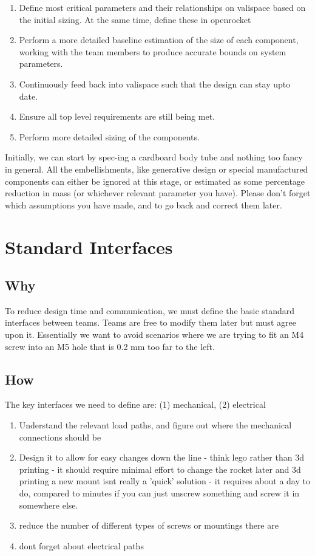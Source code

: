 \documentclass[12pt]{article}
\begin{document}
\begin{enumerate}
\item Define most critical parameters and their relationships on valispace based on the initial sizing. At the same time, define these in openrocket 
\item  Perform a more detailed baseline estimation of the size of each component, working with the team members to produce accurate bounds on system parameters. 
\item  Continuously feed back into valispace such that the design can stay upto date. 
\item Ensure all top level requirements are still being met. 
\item Perform more detailed sizing of the components. 
\end{enumerate}


Initially, we can start by spec-ing a cardboard body tube and nothing too fancy in general. All the embellishments, like generative design or special manufactured components can either be ignored at this stage, or estimated as some percentage reduction in mass (or whichever relevant parameter you have). Please don't forget which assumptions you have made, and to go back and correct them later. 

\section{Standard Interfaces}

\subsection{Why}
To reduce design time and communication, we must define the basic standard interfaces between teams. Teams are free to modify them later but must agree upon it. Essentially we want to avoid scenarios where we are trying to fit an M4 screw into an M5 hole that is 0.2 mm too far to the left. 

\subsection{How}

The key interfaces we need to define are:  (1) mechanical, (2) electrical

\begin{enumerate}
\item Understand the relevant load paths, and figure out where the mechanical connections should be
\item Design it to allow for easy changes down the line - think lego rather than 3d printing - it should require minimal effort to change the rocket later and 3d printing a new mount isnt really a 'quick' solution - it requires about a day to do, compared to minutes if you can just unscrew something and screw it in somewhere else. 
\item reduce the number of different types of screws or mountings there are 
\item dont forget about electrical paths
\end{enumerate}
\end{document}
